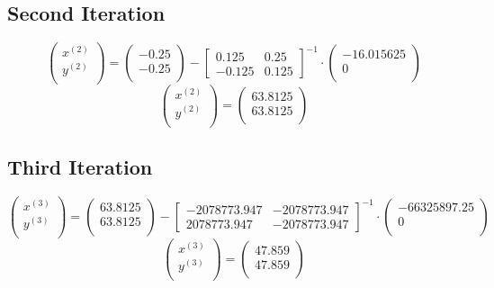\documentclass{article}
\begin{document}
\subsection*{Second Iteration}
\[
\begin{pmatrix}
  x^{(2)}  \\[1ex] 
  y^{(2)}  \\[1ex]
\end{pmatrix}
=
\begin{pmatrix}
  -0.25 \\[1ex] 
  -0.25  \\[1ex]
\end{pmatrix}
-
\begin{bmatrix}
  0.125 & 0.25 \\[1ex] 
  -0.125 & 0.125
\end{bmatrix}^{-1}
\cdot 
\begin{pmatrix}
  -16.015625 \\[1ex] 
  0 \\[1ex] 
\end{pmatrix}
\]
\[
\begin{pmatrix}
  x^{(2)}  \\[1ex] 
  y^{(2)}  \\[1ex]
\end{pmatrix}
=
\begin{pmatrix}
  63.8125 \\[1ex] 
  63.8125 \\[1ex] 
\end{pmatrix}
\]

\subsection*{Third Iteration}
\[
\begin{pmatrix}
  x^{(3)}  \\[1ex] 
  y^{(3)}  \\[1ex]
\end{pmatrix}
=
\begin{pmatrix}
  63.8125  \\[1ex] 
  63.8125  \\[1ex]
\end{pmatrix}
-
\begin{bmatrix}
  -2078773.947 & -2078773.947 \\[1ex] 
  2078773.947 & -2078773.947
\end{bmatrix}^{-1}
\cdot 
\begin{pmatrix}
  -66325897.25 \\[1ex] 
  0 \\[1ex] 
\end{pmatrix}
\]
\[
\begin{pmatrix}
  x^{(3)}  \\[1ex] 
  y^{(3)}  \\[1ex]
\end{pmatrix}
=
\begin{pmatrix}
  47.859 \\[1ex] 
  47.859 \\[1ex] 
\end{pmatrix}
\]
\end{document}
